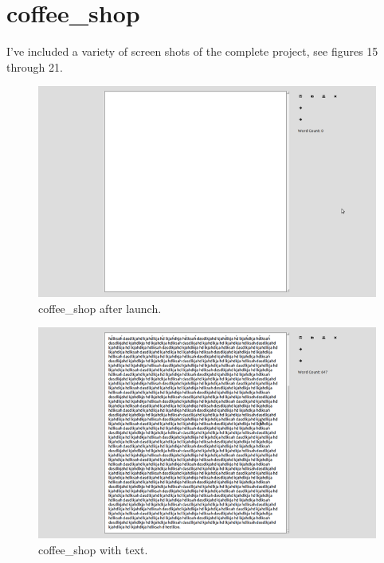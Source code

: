 \documentclass[10pt]{article}
\begin{document}
\section{coffee\_shop}

I've included a variety of screen shots of the complete project, see figures 15 through 21.

\begin{figure}
   \centering
      \includegraphics[width=130mm]{images/coffee_shop1.png}
   \caption{coffee\_shop after launch.}
\end{figure}

\begin{figure}
   \centering
      \includegraphics[width=130mm]{images/coffee_shop2.png}
   \caption{coffee\_shop with text.}
\end{figure}
\end{document}
